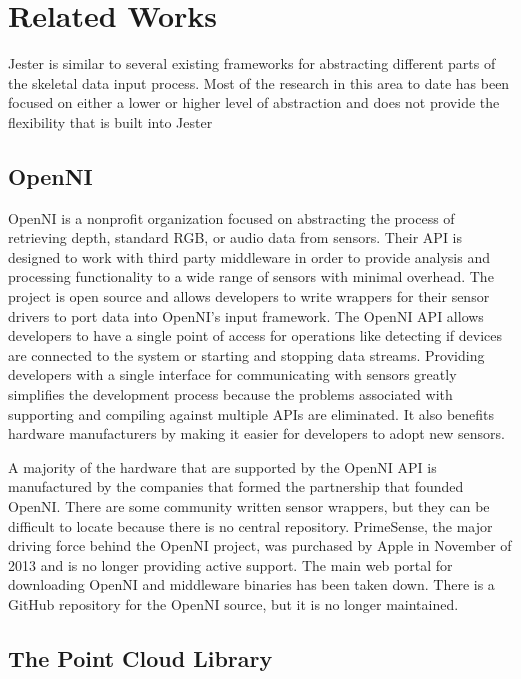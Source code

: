 \chapter{Related Works}

Jester is similar to several existing frameworks for abstracting different parts of the skeletal data input process. Most of the research in this area to date has been focused on either a lower or higher level of abstraction and does not provide the flexibility that is built into Jester

\section{OpenNI}

OpenNI is a nonprofit organization focused on abstracting the process of retrieving depth, standard RGB, or audio data from sensors. Their API is designed to work with third party middleware in order to provide analysis and processing functionality to a wide range of sensors with minimal overhead. The project is open source and allows developers to write wrappers for their sensor drivers to port data into OpenNI’s input framework. The OpenNI API allows developers to have a single point of access for operations like detecting if devices are connected to the system or starting and stopping data streams. Providing developers with a single interface for communicating with sensors greatly simplifies the development process because the problems associated with supporting and compiling against multiple APIs are eliminated. It also benefits hardware manufacturers by making it easier for developers to adopt new sensors.

A majority of the hardware that are supported by the OpenNI API is manufactured by the companies that formed the partnership that founded OpenNI. There are some community written sensor wrappers, but they can be difficult to locate because there is no central repository. PrimeSense, the major driving force behind the OpenNI project, was purchased by Apple in November of 2013 and is no longer providing active support. The main web portal for downloading OpenNI and middleware binaries has been taken down. There is a GitHub repository for the OpenNI source, but it is no longer maintained.

\section{The Point Cloud Library}

